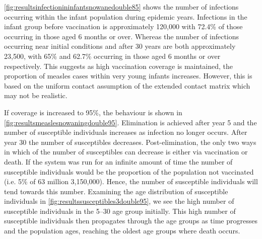 \documentclass[a4paper,11pt] {scrartcl}
\begin{document}
\autoref{fig:resultsinfectionininfantsnowanedouble85} shows the number of infections occurring within the infant population during epidemic years. Infections in the infant group before vaccination is approximately 120,000 with 72.4\% of those occurring in those aged 6 months or over. Whereas the number of infections occurring near initial conditions and after 30 years are both approximately 23,500, with 65\% and 62.7\% occurring in those aged 6 months or over respectively. This suggests as high vaccination coverage is maintained, the proportion of measles cases within very young infants increases. However, this is based on the uniform contact assumption of the extended contact matrix which may not be realistic.

If coverage is increased to 95\%, the behaviour is shown in \autoref{fig:resultsmeaslesnowaningdouble95}. Elimination is achieved after year 5 and the number of susceptible individuals increases as infection no longer occurs. After year 30 the number of susceptibles decreases. Post-elimination, the only two ways in which of the number of susceptibles can decrease is either via vaccination or death. If the system was run for an infinite amount of time the number of susceptible individuals would be the proportion of the population not vaccinated (i.e. 5\% of 63 million 3,150,000). Hence, the number of susceptible individuals will tend towards this number. Examining the age distribution of susceptible individuals in \autoref{fig:resultssusceptibles3double95}, we see the high number of susceptible individuals in the 5--30 age group initially. This high number of susceptible individuals then propagates through the age groups as time progresses and the population ages, reaching the oldest age groups where death occurs.
\end{document}
